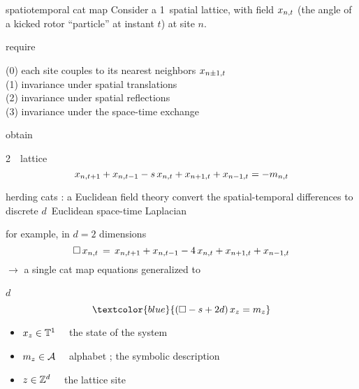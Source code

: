 \begin{frame}{spatiotemporal cat map
}
Consider
a 1\dmn\ spatial lattice, with field $x_{n,t}$  (the angle of a kicked
rotor ``particle'' at instant $t$)  at site $n$.

\bigskip

require

\medskip
{\small
(0) each site couples to
its nearest neighbors $x_{n\pm1,t}$
\\(1) invariance under
spatial translations
\\(2) invariance under spatial reflections
\\(3) invariance under the space-time exchange
}

\bigskip

obtain
\begin{block}{2\dmn\ \catlatt\ lattice}
\[
x_{n,t+1} + x_{n,t-1} - s \, x_{n,t} + x_{n+1,t} + x_{n-1, t}
     =-{m_{n,t}}
\] %
\end{block}

\vfill


\end{frame}

\begin{frame}{herding cats : a Euclidean field theory
}
convert the spatial-temporal differences to %
discrete $d$\dmn\ Euclidean space-time Laplacian

\medskip

for example, in $d=2$ dimensions
%
%
\[
\Box\,x_{n,t} \,=\, x_{n,t+1} + x_{n,t-1}
- 4 \, x_{n,t} + x_{n+1,t} + x_{n-1, t}
\]
$\to$ a single cat map equations generalized  to
\begin{block}{$d$\dmn\ \catlatt}
\[
\textcolor{blue}{
 (\Box -s+2d)\,\ssp_{z} = \m_z
                 }
\] %

\medskip
\end{block}
\begin{itemize}
  \item \( x_{z} \in  \mathbb{T}^{1}  \quad \)
the state of the system
  \item \({m_{z}} \in \mathcal{A} \quad\)
alphabet ; the symbolic description
  \item \(  z\in \mathbb{Z}^{d}  \quad\)
the lattice site
\end{itemize}
\end{frame}


